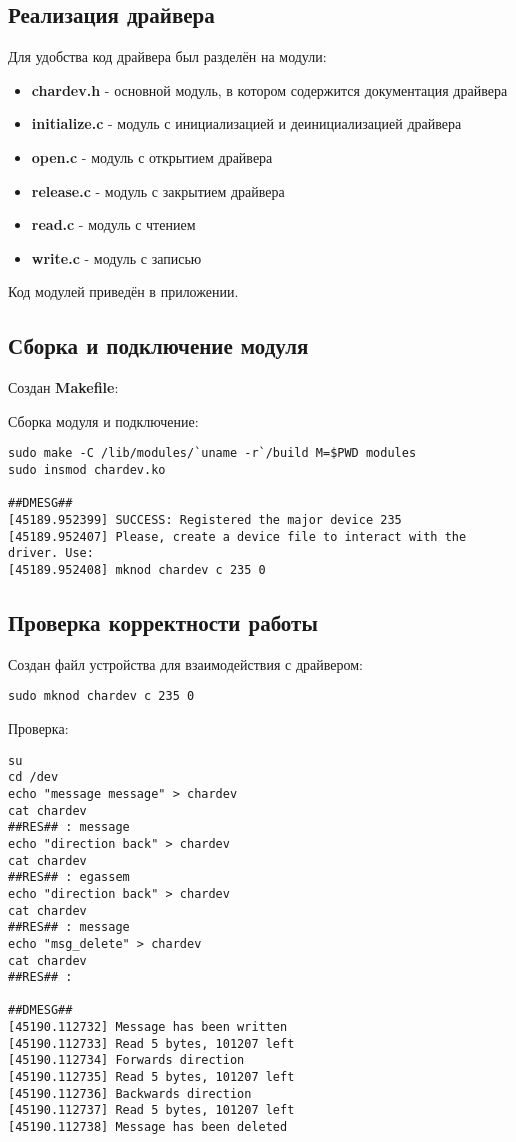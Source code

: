 \documentclass[a4paper,11pt]{article}
\begin{document}
  \subsection{Реализация драйвера}
    Для удобства код драйвера был разделён на модули:
    \begin{itemize}
      \item \textbf{chardev.h} - основной модуль, в котором содержится документация драйвера
      \item \textbf{initialize.c} - модуль с инициализацией и деинициализацией драйвера
      \item \textbf{open.c} - модуль с открытием драйвера
      \item \textbf{release.c} - модуль с закрытием драйвера
      \item \textbf{read.c} - модуль с чтением
      \item \textbf{write.c} - модуль с записью
    \end{itemize}
    Код модулей приведён в приложении.

  \subsection{Сборка и подключение модуля}
    Создан \textbf{Makefile}:
    

    Сборка модуля и подключение:
    \begin{lstlisting}
sudo make -C /lib/modules/`uname -r`/build M=$PWD modules
sudo insmod chardev.ko

##DMESG##
[45189.952399] SUCCESS: Registered the major device 235
[45189.952407] Please, create a device file to interact with the driver. Use:
[45189.952408] mknod chardev c 235 0
    \end{lstlisting}
    \newpage

  \subsection{Проверка корректности работы}
    Создан файл устройства для взаимодействия с драйвером:
    \begin{lstlisting}
sudo mknod chardev c 235 0
    \end{lstlisting}

    Проверка:
    \begin{lstlisting}
su 
cd /dev
echo "message message" > chardev
cat chardev
##RES## : message
echo "direction back" > chardev
cat chardev
##RES## : egassem
echo "direction back" > chardev
cat chardev
##RES## : message
echo "msg_delete" > chardev
cat chardev
##RES## :

##DMESG##
[45190.112732] Message has been written
[45190.112733] Read 5 bytes, 101207 left
[45190.112734] Forwards direction
[45190.112735] Read 5 bytes, 101207 left
[45190.112736] Backwards direction
[45190.112737] Read 5 bytes, 101207 left
[45190.112738] Message has been deleted
    \end{lstlisting}
\end{document}
